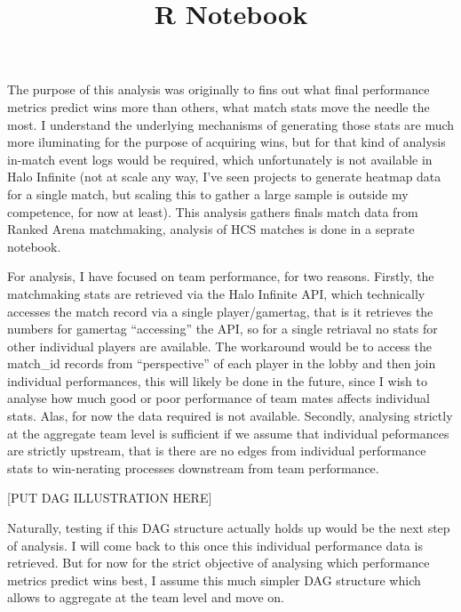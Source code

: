 \documentclass[
]{article}
\title{R Notebook}
\author{}
\date{\vspace{-2.5em}}
\begin{document}
\maketitle

The purpose of this analysis was originally to fins out what final
performance metrics predict wins more than others, what match stats move
the needle the most. I understand the underlying mechanisms of
generating those stats are much more iluminating for the purpose of
acquiring wins, but for that kind of analysis in-match event logs would
be required, which unfortunately is not available in Halo Infinite (not
at scale any way, I've seen projects to generate heatmap data for a
single match, but scaling this to gather a large sample is outside my
competence, for now at least). This analysis gathers finals match data
from Ranked Arena matchmaking, analysis of HCS matches is done in a
seprate notebook.

For analysis, I have focused on team performance, for two reasons.
Firstly, the matchmaking stats are retrieved via the Halo Infinite API,
which technically accesses the match record via a single
player/gamertag, that is it retrieves the numbers for gamertag
``accessing'' the API, so for a single retriaval no stats for other
individual players are available. The workaround would be to access the
match\_id records from ``perspective'' of each player in the lobby and
then join individual performances, this will likely be done in the
future, since I wish to analyse how much good or poor performance of
team mates affects individual stats. Alas, for now the data required is
not available. Secondly, analysing strictly at the aggregate team level
is sufficient if we assume that individual peformances are strictly
upstream, that is there are no edges from individual performance stats
to win-nerating processes downstream from team performance.

{[}PUT DAG ILLUSTRATION HERE{]}

Naturally, testing if this DAG structure actually holds up would be the
next step of analysis. I will come back to this once this individual
performance data is retrieved. But for now for the strict objective of
analysing which performance metrics predict wins best, I assume this
much simpler DAG structure which allows to aggregate at the team level
and move on.
\end{document}
